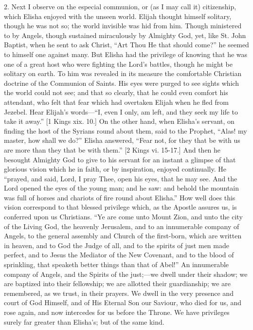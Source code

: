 2. Next I observe on the especial communion, or (as I may call it)
citizenship, which Elisha enjoyed with the unseen world. Elijah
thought himself solitary, though he was not so; the world invisible
was hid from him. Though ministered to by Angels, though sustained
miraculously by Almighty God, yet, like St. John Baptist, when he sent
to ask Christ, ``Art Thou He that should come?'' he seemed to
himself one against many. But Elisha had the privilege of knowing that
he was one of a great host who were fighting the Lord's battles,
though he might be solitary on earth. To him was revealed in its
measure the comfortable Christian doctrine of the Communion of Saints.
His eyes were purged to see sights which the world could not see; and
that so clearly, that he could even comfort his attendant, who felt
that fear which had overtaken Elijah when he fled from Jezebel. Hear
Elijah's words—``I, even I only, am left, and they seek my life
to take it away.'' [1 Kings xix. 10.] On the other hand, when
Elisha's servant, on finding the host of the Syrians round about them,
said to the Prophet, ``Alas! my master, how shall we do?''
Elisha answered, ``Fear not, for they that be with us are more
than they that be with them.'' [2 Kings vi. 15-17.] And then he
besought Almighty God to give to his servant for an instant a glimpse
of that glorious vision which he in faith, or by inspiration, enjoyed
continually. He ``prayed, and said, Lord, I pray Thee, open his
eyes, that he may see. And the Lord opened the eyes of the young man;
and he saw: and behold the mountain was full of horses and chariots of
fire round about Elisha.'' How well does this vision correspond to
that blessed privilege which, as the Apostle assures us, is conferred
upon us Christians. ``Ye are come unto Mount Zion, and unto the
city of the Living God, the heavenly Jerusalem, and to an innumerable
company of Angels, to the general assembly and Church of the
first-born, which are written in heaven, and to God the Judge of all,
and to the spirits of just men made perfect, and to Jesus the Mediator
of the New Covenant, and to the blood of sprinkling, that speaketh
better things than that of Abel!'' An innumerable company of
Angels, and the Spirits of the just;—we dwell under their shadow; we
are baptized into their fellowship; we are allotted their
guardianship; we are remembered, as we trust, in their prayers. We
dwell in the very presence and court of God Himself, and of His
Eternal Son our Saviour, who died for us, and rose again, and now
intercedes for us before the Throne. We have privileges surely far
greater than Elisha's; but of the same kind.

